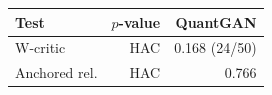 \begin{tabular}{lrr}
\toprule
Test & $p$-value & QuantGAN \\
\midrule
W-critic & HAC & 0.168 (24/50) \\
Anchored rel. & HAC & 0.766 \\
\bottomrule
\end{tabular}
